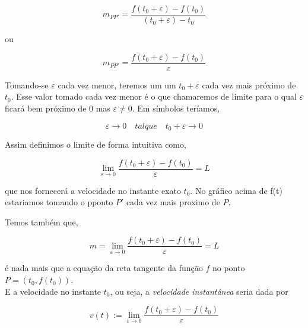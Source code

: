\documentclass[a4paper, 12pt]{report}
\begin{document}
	
	$$m_{PP'} = \frac{f(t_0+\varepsilon) - f(t_0)}{(t_0 + \varepsilon) - t_0}$$
	
	
	ou
	
	\begin{equation}
	m_{PP'} = \frac{f(t_0+\varepsilon) - f(t_0)}{\varepsilon}	
	\end{equation}
	
	Tomando-se $\varepsilon$ cada vez menor, teremos um um $t_0 + \varepsilon$ cada vez mais próximo de $t_0$. Esse valor tomado cada vez menor é o que chamaremos de limite para o qual $\varepsilon$ ficará bem próximo de $0$ mas $\varepsilon \neq 0$. Em símbolos teríamos,

	$$\varepsilon \longrightarrow 0 \quad talque \quad t_0+\varepsilon \longrightarrow 0$$
	
	Assim definimos o limite de forma intuitiva como,
	
	\begin{equation}
		\lim_{\varepsilon \rightarrow 0} \frac{f(t_0+\varepsilon) - f(t_0)}{\varepsilon} = L
	\end{equation}
	
	que nos fornecerá a velocidade no instante exato $t_0$. No gráfico acima de f(t) estariamos tomando o pponto $P'$ cada vez mais proximo de $P$.
	
	Temos também que,
	
	$$ m = \lim_{\varepsilon \rightarrow 0} \frac{f(t_0+\varepsilon) - f(t_0)}{\varepsilon} = L$$
	
	é nada mais que a equação da reta tangente da função $f$ no ponto $ P = (t_0, f(t_0))$.
	\\
	
	E a velocidade no instante $t_0$, ou seja, a \textit{velocidade instantânea} seria dada por
	
	\begin{equation}
	v(t) := \lim_{\varepsilon \rightarrow 0} \frac{f(t_0+\varepsilon) - f(t_0)}{\varepsilon} 
	\end{equation}
\end{document}
